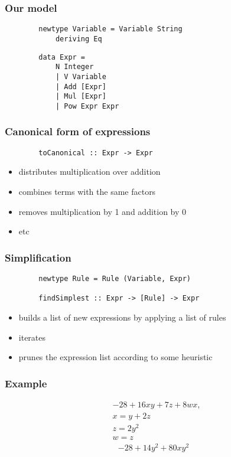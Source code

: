 \documentclass[english, 12pt, t, aspectratio=169]{beamer}
\begin{document}
\begin{frame}[fragile]
	\frametitle{Our model}
	\begin{verbatim}
		newtype Variable = Variable String
		    deriving Eq
	\end{verbatim}
	\begin{verbatim}
		data Expr =
		    N Integer
		    | V Variable
		    | Add [Expr]
		    | Mul [Expr]
		    | Pow Expr Expr
	\end{verbatim}
	
\end{frame}
\begin{frame}[fragile]
	\frametitle{Canonical form of expressions}
	\begin{verbatim}
		toCanonical :: Expr -> Expr
	\end{verbatim}
	\begin{itemize}
		\item distributes multiplication over addition
		\item combines terms with the same factors
		\item removes multiplication by 1 and addition by 0
		\item etc
	\end{itemize}
\end{frame}
\begin{frame}[fragile]
	\frametitle{Simplification}
	\begin{verbatim}
		newtype Rule = Rule (Variable, Expr)

		findSimplest :: Expr -> [Rule] -> Expr
	\end{verbatim}

	\begin{itemize}
		\item builds a list of new expressions by applying a list of rules
		\item iterates
		\item prunes the expression list according to some heuristic
	\end{itemize}
\end{frame}
\begin{frame}[fragile]
	\frametitle{Example}
	\begin{align}
		&-28 + 16 x y + 7 z + 8 w x,\\
		&x = y + 2 z\\
        &z = 2 y^2\\
        &w = z
	\end{align}
	\begin{align}
		-28 + 14 y^2 + 80 x y^2
	\end{align}
	
\end{frame}
\end{document}
